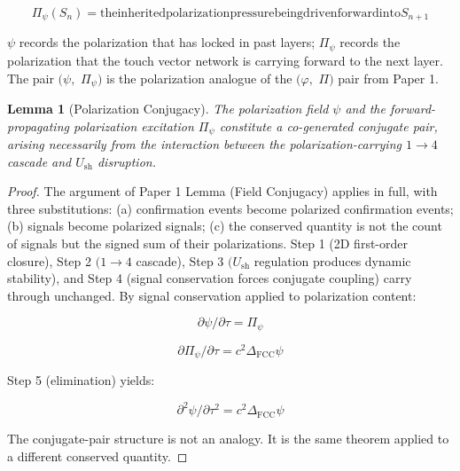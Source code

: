 \documentclass[11pt,oneside]{report}
\newtheorem{lemma}[theorem]{Lemma}
\theoremstyle{definition}
\theoremstyle{remark}
\begin{document}
\begin{equation*}
\Pi_{\psi}(S_{n}) = \text{the} \text{inherited} \text{polarization} \text{pressure} \text{being} \text{driven}
\text{forward} \text{into} S_{n+1}
\end{equation*}

\ensuremath{\psi} records the polarization that has locked in past layers; \ensuremath{\Pi_{\psi}} records
the polarization that the touch vector network is carrying forward to
the next layer. The pair \ensuremath{(\psi ,} \ensuremath{\Pi_{\psi})} is the polarization analogue of the
\ensuremath{(\varphi ,} \ensuremath{\Pi )} pair from Paper 1.

\begin{lemma}[Polarization Conjugacy]
The polarization field \ensuremath{\psi} and the
forward-propagating polarization excitation \ensuremath{\Pi_{\psi}} constitute a
co-generated conjugate pair, arising necessarily from the interaction
between the polarization-carrying \ensuremath{1\to 4} cascade and \ensuremath{U_{\mathrm{sh}}} disruption.
\end{lemma}

\begin{proof}
The argument of Paper 1 Lemma (Field Conjugacy) applies in full,
with three substitutions: (a) confirmation events become polarized
confirmation events; (b) signals become polarized signals; (c) the
conserved quantity is not the count of signals but the signed sum of
their polarizations. Step 1 (2D first-order closure), Step 2 \ensuremath{(1\to 4}
cascade), Step 3 \ensuremath{(U_{\mathrm{sh}}} regulation produces dynamic stability), and Step 4
(signal conservation forces conjugate coupling) carry through unchanged.
By signal conservation applied to polarization content:

\begin{equation*}
\partial \psi / \partial \tau = \Pi_{\psi}
\end{equation*}

\begin{equation*}
\partial \Pi_{\psi} / \partial \tau = c^{2} \Delta_{\mathrm{FCC}} \psi
\end{equation*}

Step 5 (elimination) yields:

\begin{equation*}
\partial ^{2}\psi / \partial \tau^{2} = c^{2} \Delta_{\mathrm{FCC}} \psi
\end{equation*}

The conjugate-pair structure is not an analogy. It is the same theorem
applied to a different conserved quantity.

\end{proof}
\end{document}
